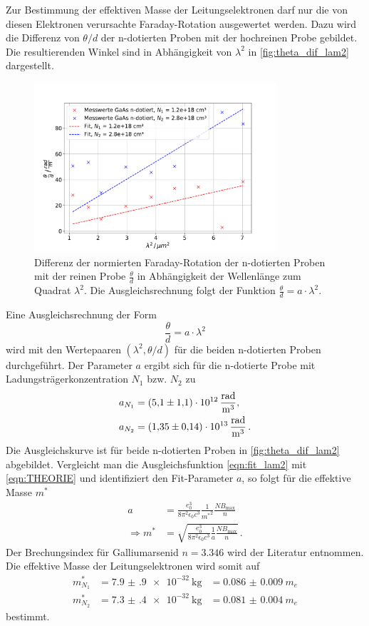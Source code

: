 Zur Bestimmung der effektiven Masse der Leitungselektronen darf nur die von diesen Elektronen verursachte Faraday-Rotation ausgewertet werden.
Dazu wird die Differenz von $\theta / d$ der n-dotierten Proben mit der hochreinen Probe gebildet.
Die resultierenden Winkel sind in Abhängigkeit von $\lambda^2$ in \autoref{fig:theta_dif_lam2} dargestellt.
\begin{figure}
    \centering
    \includegraphics[width=0.8\textwidth]{figure/theta_lam2_dif.pdf}
    \caption{Differenz der normierten Faraday-Rotation der n-dotierten Proben mit der reinen Probe $\frac{\theta}{d}$ in Abhängigkeit der Wellenlänge zum Quadrat $\lambda^2$.
    Die Ausgleichsrechnung folgt der Funktion $\frac{\theta}{d} = a\cdot \lambda^2$.
    }
    \label{fig:theta_dif_lam2}
\end{figure}
Eine Ausgleichsrechnung der Form
\begin{equation}
    \frac{\theta}{d} = a \cdot \lambda^2
    \label{eqn:fit_lam2}
\end{equation}
wird mit den Wertepaaren $(\lambda^2, \theta / d)$ für die beiden n-dotierten Proben durchgeführt.
Der Parameter $a$ ergibt sich für die n-dotierte Probe mit Ladungsträgerkonzentration $N_1$ bzw. $N_2$ zu
\begin{align*}
    a_{N_1} &= \qty{5.1(11)e+12}{\frac{rad}{\metre^3}}, \\
    a_{N_2} &= \qty{1.35(14)e+13}{\frac{rad}{\metre^3}} \, . \\
\end{align*}
Die Ausgleichskurve ist für beide n-dotierten Proben in \autoref{fig:theta_dif_lam2} abgebildet.
Vergleicht man die Ausgleichsfunktion \autoref{eqn:fit_lam2} mit \autoref{eqn:THEORIE} und identifiziert den Fit-Parameter $a$, so folgt für die effektive Masse $m^*$%
\begin{align}
    a &= \frac{e_0^3}{8 \pi^2 \epsilon_0 c^3} \frac{1}{{m^*}^2} \frac{N B_\text{max}}{n} \\
    \Rightarrow m^* &= \sqrt{\frac{e_0^3}{8 \pi^2 \epsilon_0 c^3} \frac{1}{a} \frac{N B_\text{max}}{n}} \, .
\end{align}
Der Brechungsindex für Galliumarsenid $n = 3.346$ wird der Literatur \cite{GaAs_n} entnommen.
Die effektive Masse der Leitungselektronen wird somit auf
\begin{align*}
    m^*_{N_1} &= \qty{7.9(9)e-32}{\kilo\gram} &= \qty{0.086(9)}{m_e} \\
    m^*_{N_2} &= \qty{7.3(4)e-32}{\kilo\gram} &= \qty{0.081(4)}{m_e}
\end{align*}
bestimmt.
\FloatBarrier